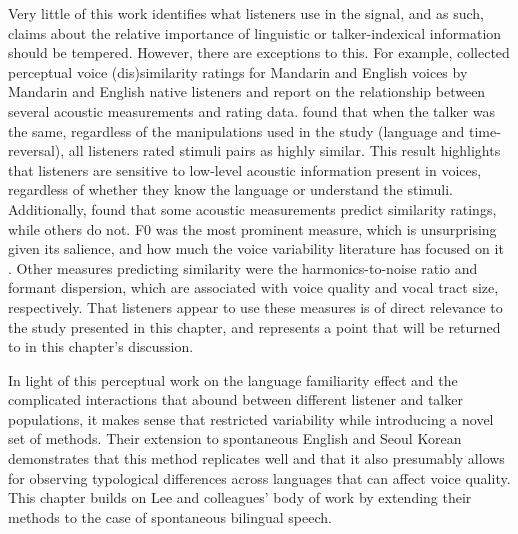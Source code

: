 Very little of this work identifies what listeners use in the signal, and as such, claims about the relative importance of linguistic or talker-indexical information should be tempered. However, there are exceptions to this. For example, \citet{perrachione_2019_judgments} collected perceptual voice (dis)similarity ratings for Mandarin and English voices by Mandarin and English native listeners and report on the relationship between several acoustic measurements and rating data. \citet{perrachione_2019_judgments} found that when the talker was the same, regardless of the manipulations used in the study (language and time-reversal), all listeners rated stimuli pairs as highly similar. This result highlights that listeners are sensitive to low-level acoustic information present in voices, regardless of whether they know the language or understand the stimuli. Additionally, \citet{perrachione_2019_judgments} found that some acoustic measurements predict similarity ratings, while others do not. F0 was the most prominent measure, which is unsurprising given its salience, and how much the voice variability literature has focused on it \cite[e.g.,][]{keating_2012_f0}. Other measures predicting similarity were the harmonics-to-noise ratio and formant dispersion, which are associated with voice quality and vocal tract size, respectively. That listeners appear to use these measures is of direct relevance to the study presented in this chapter, and represents a point that will be returned to in this chapter's discussion.

In light of this perceptual work on the language familiarity effect and the complicated interactions that abound between different listener and talker populations, it makes sense that \citet{lee_2019_acoustic} restricted variability while introducing a novel set of methods. Their extension to spontaneous English and Seoul Korean demonstrates that this method replicates well and that it also presumably allows for observing typological differences across languages that can affect voice quality. This chapter builds on Lee and colleagues' body of work by extending their methods to the case of spontaneous bilingual speech. 


